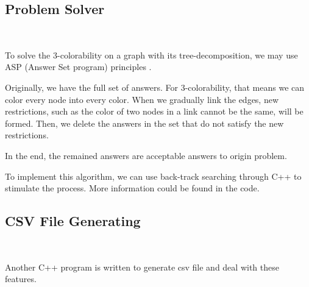 \subsection{Problem Solver}~\label{sec.DataGen3}

To solve the 3-colorability on a graph with its tree-decomposition, we may use ASP (Answer Set program) principles \cite{ASP2008}.

Originally, we have the full set of answers. For 3-colorability, that means we can color every node into every color. When we gradually link the edges, new restrictions, such as the color of two nodes in a link cannot be the same, will be formed. Then, we delete the answers in the set that do not satisfy the new restrictions.

In the end, the remained answers are acceptable answers to origin problem.

To implement this algorithm, we can use back-track searching through C++ to stimulate the process. More information could be found in the code.

\subsection{CSV File Generating}~\label{sec.DataGen4}

Another C++ program is written to generate csv file and deal with these features.